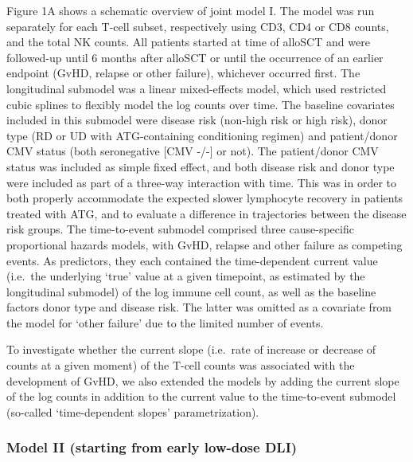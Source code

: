 \documentclass[
  letterpaper,
  DIV=11,
  numbers=noendperiod]{scrreprt}
\begin{document}
Figure 1A shows a schematic overview of joint model I. The model was run
separately for each T-cell subset, respectively using CD3, CD4 or CD8
counts, and the total NK counts. All patients started at time of alloSCT
and were followed-up until 6 months after alloSCT or until the
occurrence of an earlier endpoint (GvHD, relapse or other failure),
whichever occurred first. The longitudinal submodel was a linear
mixed-effects model, which used restricted cubic splines to flexibly
model the log counts over time. The baseline covariates included in this
submodel were disease risk (non-high risk or high risk), donor type (RD
or UD with ATG-containing conditioning regimen) and patient/donor CMV
status (both seronegative {[}CMV -/-{]} or not). The patient/donor CMV
status was included as simple fixed effect, and both disease risk and
donor type were included as part of a three-way interaction with time.
This was in order to both properly accommodate the expected slower
lymphocyte recovery in patients treated with ATG, and to evaluate a
difference in trajectories between the disease risk groups. The
time-to-event submodel comprised three cause-specific proportional
hazards models, with GvHD, relapse and other failure as competing
events. As predictors, they each contained the time-dependent current
value (i.e.~the underlying `true' value at a given timepoint, as
estimated by the longitudinal submodel) of the log immune cell count, as
well as the baseline factors donor type and disease risk. The latter was
omitted as a covariate from the model for `other failure' due to the
limited number of events.

To investigate whether the current slope (i.e.~rate of increase or
decrease of counts at a given moment) of the T-cell counts was
associated with the development of GvHD, we also extended the models by
adding the current slope of the log counts in addition to the current
value to the time-to-event submodel (so-called `time-dependent slopes'
parametrization).

\hypertarget{model-ii-starting-from-early-low-dose-dli}{%
\subsubsection{Model II (starting from early low-dose
DLI)}\label{model-ii-starting-from-early-low-dose-dli}}
\end{document}
